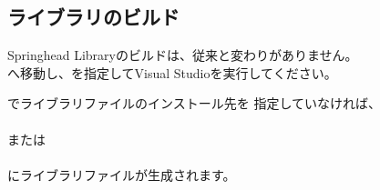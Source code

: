 \subsection{ライブラリのビルド}
\label{subsec:BuildLibrary}

\noindent
Springhead Libraryのビルドは、従来と変わりがありません。\\
\build へ移動し、を指定してVisual Studioを実行してください。

\medskip
\noindent
{}でライブラリファイルのインストール先を
指定していなければ、\\
\hspace{20pt}\\
または\\
\hspace{20pt}\\
にライブラリファイルが生成されます。


